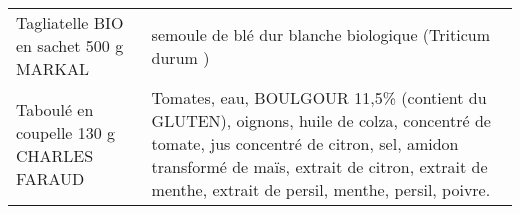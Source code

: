 \begin{longtable}{p{5cm}p{10cm}}
                                                                   Tagliatelle BIO en sachet 500 g MARKAL &                                                                                                                                                                                                                                                                                                                                                                                                                                                                                                                                                                                                                                                                                                                                                                                                                                                                                                                                                                                  semoule de blé dur blanche biologique (Triticum durum ) \\
                                                                 Taboulé en coupelle 130 g CHARLES FARAUD &                                                                                                                                                                                                                                                                                                                                                                                                                                                                                                                                                                                                                                                                                                                                                                                               Tomates, eau, BOULGOUR 11,5\% (contient du GLUTEN), oignons, huile de colza, concentré de tomate, jus concentré de citron, sel, amidon transformé de maïs, extrait de citron, extrait de menthe, extrait de persil, menthe, persil, poivre. \\

\end{longtable}
